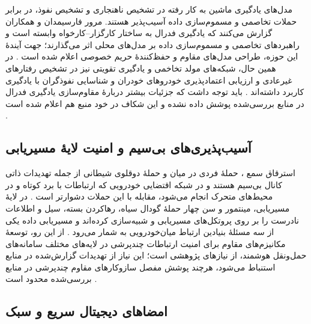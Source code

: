 مدل‌های یادگیری ماشین به کار رفته در تشخیص ناهنجاری و تشخیص نفوذ، در برابر حملات تخاصمی و مسموم‌سازی داده  آسیب‌پذیر هستند. مرور فارسیمدان و همکاران گزارش می‌کنند که یادگیری فدرال به ساختار کارگزار–کارخواه وابسته است و راهبردهای تخاصمی و مسموم‌سازی داده بر مدل‌های محلی اثر می‌گذارند؛ جهت آیندهٔ این حوزه، طراحی مدل‌های مقاوم و حفظ‌کنندهٔ حریم خصوصی اعلام شده است \cite{farsimadanReviewSecurityChallenges2025}. در همین حال، شبکه‌های مولد تخاخمی  و یادگیری تقویتی نیز در تشخیص رفتارهای غیرعادی و ارزیابی اعتمادپذیری خودروهای خودران و شناسایی نفوذگران با یادگیری  کاربرد داشته‌اند \cite{farsimadanReviewSecurityChallenges2025}. باید توجه داشت که جزئیات بیشتر دربارهٔ مقاوم‌سازی یادگیری فدرال در منابع بررسی‌شده پوشش داده نشده و این شکاف در خود منبع هم اعلام شده است \cite{farsimadanReviewSecurityChallenges2025}.

\subsection{آسیب‌پذیری‌های بی‌سیم و امنیت لایهٔ مسیریابی}

استرقاق سمع ، حملهٔ فردی در میان  و حملهٔ دوقلوی شیطانی  از جمله تهدیدات ذاتی کانال بی‌سیم هستند و در شبکه اقتضایی خودرویی که ارتباطات با برد کوتاه و در محیط‌های متحرک انجام می‌شود، مقابله با این حملات دشوارتر است \cite{farsimadanReviewSecurityChallenges2025}. در لایهٔ مسیریابی، مینتمور و سن چهار حملهٔ گودال سیاه، رهاکردن بسته، سیل و اطلاعات نادرست را بر روی پروتکل‌های مسیریابی  و  شبیه‌سازی کرده‌اند \cite{VanetSecurityPrivacy} و مسیریابی داده یکی از سه مسئلهٔ بنیادین ارتباط میان‌خودرویی به شمار می‌رود \cite{hozouriOverviewVANETVehicular2023}. از این رو، توسعهٔ مکانیزم‌های مقاوم برای امنیت ارتباطات چندپرشی در لایه‌های مختلف سامانه‌های حمل‌ونقل هوشمند، از نیازهای پژوهشی است؛ این نیاز از تهدیدات گزارش‌شده در منابع استنباط می‌شود، هرچند پوشش مفصل سازوکارهای مقاوم چندپرشی در منابع بررسی‌شده محدود است \cite{farsimadanReviewSecurityChallenges2025, VanetSecurityPrivacy}.

\subsection{امضاهای دیجیتال سریع و سبک}

